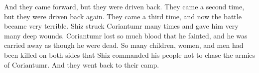 And they came forward, but they were driven back. They came a second time, but they were driven back again. They came a third time, and now the battle became very terrible.
\bverse \iffalse And it came to pass that Shiz smote upon Coriantumr that he gave him many deep wounds; and Coriantumr, having lost his blood, fainted, and was carried away as though he were dead. \fi
Shiz struck Coriantumr many times and gave him very many deep wounds. Coriantumr lost so much blood that he fainted, and he was carried away as though he were dead. 
\bverse \iffalse Now the loss of men, women and children on both sides was so great that Shiz commanded his people that they should not pursue the armies of Coriantumr; wherefore, they returned to their camp. \fi
So many children, women, and men had been killed on both sides that Shiz commanded his people not to chase the armies of Coriantumr. And they went back to their camp.

